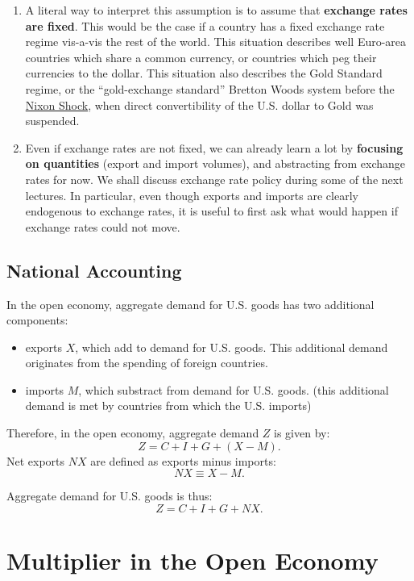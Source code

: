 \documentclass[]{book}
\providecommand{\tightlist}{%
  \setlength{\itemsep}{0pt}\setlength{\parskip}{0pt}}
\theoremstyle{definition}
\theoremstyle{definition}
\theoremstyle{definition}
\theoremstyle{remark}
\begin{document}
\begin{enumerate}
\def\labelenumi{\arabic{enumi}.}
\item
  A literal way to interpret this assumption is to assume that
  \textbf{exchange rates are fixed}. This would be the case if a country
  has a fixed exchange rate regime vis-a-vis the rest of the world. This
  situation describes well Euro-area countries which share a common
  currency, or countries which peg their currencies to the dollar. This
  situation also describes the Gold Standard regime, or the
  ``gold-exchange standard'' Bretton Woods system before the
  \href{https://en.wikipedia.org/wiki/Nixon_shock}{Nixon Shock}, when
  direct convertibility of the U.S. dollar to Gold was suspended.
\item
  Even if exchange rates are not fixed, we can already learn a lot by
  \textbf{focusing on quantities} (export and import volumes), and
  abstracting from exchange rates for now. We shall discuss exchange
  rate policy during some of the next lectures. In particular, even
  though exports and imports are clearly endogenous to exchange rates,
  it is useful to first ask what would happen if exchange rates could
  not move.
\end{enumerate}

\subsection{National Accounting}\label{national-accounting}

In the open economy, aggregate demand for U.S. goods has two additional
components:

\begin{itemize}
\tightlist
\item
  exports \(X\), which add to demand for U.S. goods. This additional
  demand originates from the spending of foreign countries.
\item
  imports \(M\), which substract from demand for U.S. goods. (this
  additional demand is met by countries from which the U.S. imports)
\end{itemize}

Therefore, in the open economy, aggregate demand \(Z\) is given by:
\[Z= C+I+G+\left(X-M\right).\] Net exports \(NX\) are defined as exports
minus imports: \[NX \equiv X-M.\]

Aggregate demand for U.S. goods is thus: \[\boxed{Z= C+I+G+NX}.\]

\section{Multiplier in the Open
Economy}\label{multiplier-in-the-open-economy}
\end{document}
